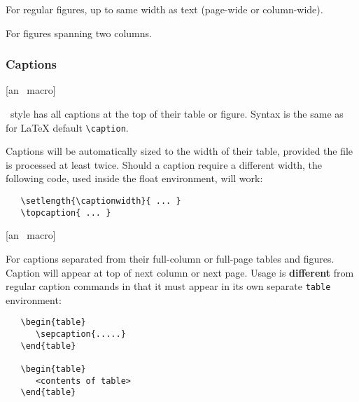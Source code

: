 \begin{description} \itemsep=0pt
   \item [{\tt \blash begin\char`\{figure\char`\}\ ... \blash
         end\char`\{figure\char`\}}]  \mbox{}

         For regular figures, up to same width as text (page-wide or
         column-wide).

   \item [{\tt \blash begin\char`\{figure*\char`\}\ ... \blash
         end\char`\{figure*\char`\}}] \mbox{}

         For figures spanning two columns.
\end{description}


\subsubsection{Captions}

\begin{description} \itemsep=0pt
   \item [{\tt \blash topcaption\char`\{...\char`\}}]  \hfill [an
         \NRC\ macro]\mbox{} 

         \NRC\ style has all captions at the top of their table or
         figure. Syntax is the same as for \LaTeX{} default
         \verb|\caption|.

        Captions will be automatically sized to the width of their
        table, provided the file is processed at least twice. Should
        a caption require a different width, the following code, used
        inside the float environment, will work:

\begin{verbatim}
   \setlength{\captionwidth}{ ... }
   \topcaption{ ... }
\end{verbatim}

   \item [{\tt \blash sepcaption\char`\{...\char`\}}] \hfill [an \NRC\
         macro]\mbox{} 

         For captions separated from their full-column or full-page
         tables and figures. Caption will appear at top of next column
         or next page. Usage is \textbf{different} from regular
         caption commands in that it must appear in its own separate
         \texttt{table} environment:
%
\begin{verbatim}
   \begin{table}
      \sepcaption{.....}
   \end{table}

   \begin{table}
      <contents of table>
   \end{table}
\end{verbatim}
\end{description}



